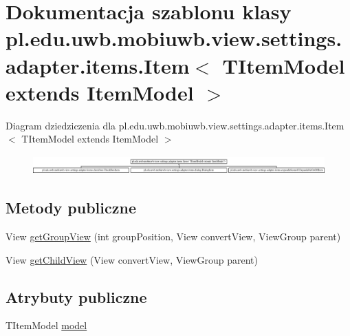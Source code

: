 \hypertarget{classpl_1_1edu_1_1uwb_1_1mobiuwb_1_1view_1_1settings_1_1adapter_1_1items_1_1_item}{}\section{Dokumentacja szablonu klasy pl.\+edu.\+uwb.\+mobiuwb.\+view.\+settings.\+adapter.\+items.\+Item$<$ T\+Item\+Model extends Item\+Model $>$}
\label{classpl_1_1edu_1_1uwb_1_1mobiuwb_1_1view_1_1settings_1_1adapter_1_1items_1_1_item}
Diagram dziedziczenia dla pl.\+edu.\+uwb.\+mobiuwb.\+view.\+settings.\+adapter.\+items.\+Item$<$ T\+Item\+Model extends Item\+Model $>$\begin{figure}[H]
\begin{center}
\leavevmode
\includegraphics[height=0.724919cm]{classpl_1_1edu_1_1uwb_1_1mobiuwb_1_1view_1_1settings_1_1adapter_1_1items_1_1_item}
\end{center}
\end{figure}
\subsection*{Metody publiczne}
\begin{DoxyCompactItemize}
\item 
View \hyperlink{classpl_1_1edu_1_1uwb_1_1mobiuwb_1_1view_1_1settings_1_1adapter_1_1items_1_1_item_ae09ca67cfc126ba1df369f8b9229c39c}{get\+Group\+View} (int group\+Position, View convert\+View, View\+Group parent)
\item 
View \hyperlink{classpl_1_1edu_1_1uwb_1_1mobiuwb_1_1view_1_1settings_1_1adapter_1_1items_1_1_item_a16b08e70108b7b313127316025ce7b8e}{get\+Child\+View} (View convert\+View, View\+Group parent)
\end{DoxyCompactItemize}
\subsection*{Atrybuty publiczne}
\begin{DoxyCompactItemize}
\item 
T\+Item\+Model \hyperlink{classpl_1_1edu_1_1uwb_1_1mobiuwb_1_1view_1_1settings_1_1adapter_1_1items_1_1_item_a318c5a53677362bdb6d6324d8f132ba6}{model}
\end{DoxyCompactItemize}
